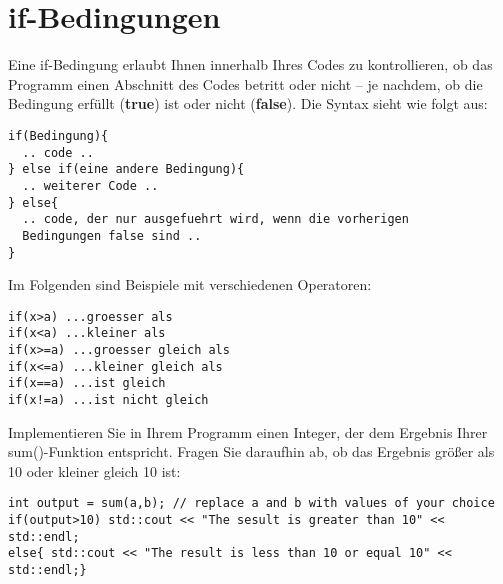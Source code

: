 \documentclass[12pt,twoside,a4paper]{article}
\begin{document}
\section{if-Bedingungen}
Eine if-Bedingung erlaubt Ihnen innerhalb Ihres Codes zu kontrollieren, ob das Programm einen Abschnitt des Codes betritt oder nicht -- je nachdem, ob die Bedingung erf\"ullt (\textbf{true}) ist oder nicht (\textbf{false}). Die Syntax sieht wie folgt aus:
\begin{lstlisting}
if(Bedingung){
  .. code ..
} else if(eine andere Bedingung){
  .. weiterer Code ..
} else{
  .. code, der nur ausgefuehrt wird, wenn die vorherigen 
  Bedingungen false sind ..
}
\end{lstlisting}
Im Folgenden sind Beispiele mit verschiedenen Operatoren:
\begin{lstlisting}
if(x>a) ...groesser als
if(x<a) ...kleiner als
if(x>=a) ...groesser gleich als
if(x<=a) ...kleiner gleich als
if(x==a) ...ist gleich
if(x!=a) ...ist nicht gleich
\end{lstlisting}
Implementieren Sie in Ihrem Programm einen Integer, der dem Ergebnis Ihrer sum()-Funktion entspricht. Fragen Sie daraufhin ab, ob das Ergebnis gr\"o{\ss}er als 10 oder kleiner gleich 10 ist:
\begin{lstlisting}
int output = sum(a,b); // replace a and b with values of your choice
if(output>10) std::cout << "The sesult is greater than 10" << std::endl;
else{ std::cout << "The result is less than 10 or equal 10" << std::endl;}
\end{lstlisting}
\end{document}
